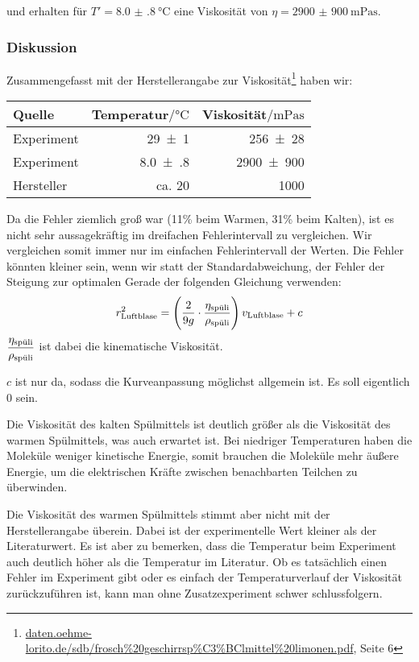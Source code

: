 		 und erhalten für $T' = \SI{8.0(8)}{\celsius}$ eine Viskosität von $\eta = \SI{2900(900)}{\milli\pascal\second}$.

	\subsubsection{Diskussion}
		Zusammengefasst mit der Herstellerangabe zur Viskosität\footnote{\url{daten.oehme-lorito.de/sdb/frosch\%20geschirrsp\%C3\%BClmittel\%20limonen.pdf}, Seite 6} haben wir:
		\begin{center}
			\begin{tabular}{lrr}
				\toprule
				Quelle & Temperatur$/\si{\celsius}$ & Viskosität$/\si{\milli\pascal\second}$ \\
				\midrule
				Experiment & \num{29(1)} & \num{256(28)} \\
				Experiment & \num{8.0(8)} & \num{2900(900)} \\
				Hersteller & ca. \num{20} & \num{1000} \\
				\bottomrule
			\end{tabular}
		\end{center}
		Da die Fehler ziemlich groß war (11\% beim Warmen, 31\% beim Kalten), ist es nicht sehr aussagekräftig im dreifachen Fehlerintervall zu vergleichen. Wir vergleichen somit immer nur im einfachen Fehlerintervall der Werten. Die Fehler könnten kleiner sein, wenn wir statt der Standardabweichung, der Fehler der Steigung zur optimalen Gerade der folgenden Gleichung verwenden:
		\begin{equation}
			r^2_\text{Luftblase} = \left(\frac{2}{9g}\cdot \frac{\eta_\spuli}{\rho_\spuli}\right)v_\text{Luftblase} + c
		\end{equation}
		$\displaystyle \frac{\eta_\spuli}{\rho_\spuli}$ ist dabei die kinematische Viskosität.

		$c$ ist nur da, sodass die Kurveanpassung möglichst allgemein ist. Es soll eigentlich $0$ sein. 

		Die Viskosität des kalten Spülmittels ist deutlich größer als die Viskosität des warmen Spülmittels, was auch erwartet ist. Bei niedriger Temperaturen haben die Moleküle weniger kinetische Energie, somit brauchen die Moleküle mehr äußere Energie, um die elektrischen Kräfte zwischen benachbarten Teilchen zu überwinden.

		Die Viskosität des warmen Spülmittels stimmt aber nicht mit der Herstellerangabe überein. Dabei ist der experimentelle Wert kleiner als der Literaturwert. Es ist aber zu bemerken, dass die Temperatur beim Experiment auch deutlich höher als die Temperatur im Literatur. Ob es tatsächlich einen Fehler im Experiment gibt oder es einfach der Temperaturverlauf der Viskosität zurückzuführen ist, kann man ohne Zusatzexperiment schwer schlussfolgern. 

